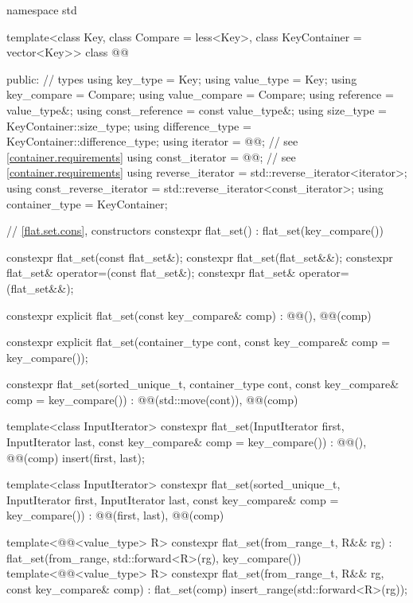 \begin{codeblock}
namespace std {
  template<class Key, class Compare = less<Key>, class KeyContainer = vector<Key>>
  class @@ {
  public:
    // types
    using key_type               = Key;
    using value_type             = Key;
    using key_compare            = Compare;
    using value_compare          = Compare;
    using reference              = value_type&;
    using const_reference        = const value_type&;
    using size_type              = KeyContainer::size_type;
    using difference_type        = KeyContainer::difference_type;
    using iterator               = @@;     // see \ref{container.requirements}
    using const_iterator         = @@;     // see \ref{container.requirements}
    using reverse_iterator       = std::reverse_iterator<iterator>;
    using const_reverse_iterator = std::reverse_iterator<const_iterator>;
    using container_type         = KeyContainer;

    // \ref{flat.set.cons}, constructors
    constexpr flat_set() : flat_set(key_compare()) { }

    constexpr flat_set(const flat_set&);
    constexpr flat_set(flat_set&&);
    constexpr flat_set& operator=(const flat_set&);
    constexpr flat_set& operator=(flat_set&&);

    constexpr explicit flat_set(const key_compare& comp)
      : @@(), @@(comp) { }

    constexpr explicit flat_set(container_type cont, const key_compare& comp = key_compare());

    constexpr flat_set(sorted_unique_t, container_type cont,
                       const key_compare& comp = key_compare())
      : @@(std::move(cont)), @@(comp) { }

    template<class InputIterator>
      constexpr flat_set(InputIterator first, InputIterator last,
                         const key_compare& comp = key_compare())
        : @@(), @@(comp)
        { insert(first, last); }

    template<class InputIterator>
      constexpr flat_set(sorted_unique_t, InputIterator first, InputIterator last,
                         const key_compare& comp = key_compare())
        : @@(first, last), @@(comp) { }

    template<@@<value_type> R>
      constexpr flat_set(from_range_t, R&& rg)
        : flat_set(from_range, std::forward<R>(rg), key_compare()) { }
    template<@@<value_type> R>
      constexpr flat_set(from_range_t, R&& rg, const key_compare& comp)
        : flat_set(comp)
        { insert_range(std::forward<R>(rg)); }

}}
\end{codeblock}
